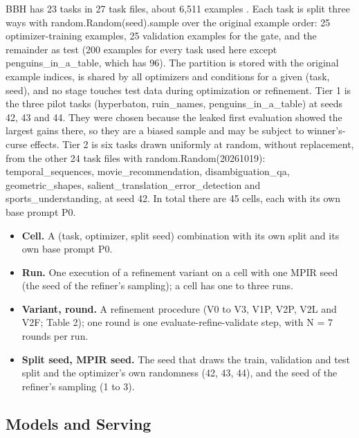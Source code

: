 \documentclass{ieeeaccess}
\begin{document}
BBH has 23 tasks in 27 task files, about 6,511 examples \cite{suzgun2023}. Each task is split three ways with random.Random(seed).sample over the original example order: 25 optimizer-training examples, 25 validation examples for the gate, and the remainder as test (200 examples for every task used here except penguins\_\allowbreak{}in\_\allowbreak{}a\_\allowbreak{}table, which has 96). The partition is stored with the original example indices, is shared by all optimizers and conditions for a given (task, seed), and no stage touches test data during optimization or refinement. Tier 1 is the three pilot tasks (hyperbaton, ruin\_\allowbreak{}names, penguins\_\allowbreak{}in\_\allowbreak{}a\_\allowbreak{}table) at seeds 42, 43 and 44. They were chosen because the leaked first evaluation showed the largest gains there, so they are a biased sample and may be subject to winner's-curse effects. Tier 2 is six tasks drawn uniformly at random, without replacement, from the other 24 task files with random.Random(20261019): temporal\_\allowbreak{}sequences, movie\_\allowbreak{}recommendation, disambiguation\_\allowbreak{}qa, geometric\_\allowbreak{}shapes, salient\_\allowbreak{}translation\_\allowbreak{}error\_\allowbreak{}detection and sports\_\allowbreak{}understanding, at seed 42. In total there are 45 cells, each with its own base prompt P0.

\begin{itemize}
\item \textbf{Cell.} A (task, optimizer, split seed) combination with its own split and its own base prompt P0.
\item \textbf{Run.} One execution of a refinement variant on a cell with one MPIR seed (the seed of the refiner's sampling); a cell has one to three runs.
\item \textbf{Variant, round.} A refinement procedure (V0 to V3, V1P, V2P, V2L and V2F; Table 2); one round is one evaluate-refine-validate step, with N = 7 rounds per run.
\item \textbf{Split seed, MPIR seed.} The seed that draws the train, validation and test split and the optimizer's own randomness (42, 43, 44), and the seed of the refiner's sampling (1 to 3).
\end{itemize}

\subsection{Models and Serving}
\end{document}
